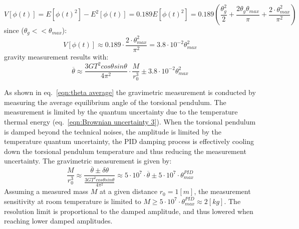\documentclass[\main/master.tex]{subfiles}
\begin{document}
\begin{equation}
V[\phi(t)] = E[\phi(t)^2] - E^2[\phi(t)] =0.189 E [\phi(t)^2] = 0.189 (\frac{\theta_g^2}{2} +\frac{2 \theta_g\theta_{max}}{\pi}+\frac{2\cdot \theta_{max}^2}{\pi^2} )
\end{equation}
 since ($\theta_g<<\theta_{max}$):
\begin{equation}
V[\phi(t)] \approx 0.189\cdot \frac{2\cdot \theta_{max}^2}{\pi^2} =  3.8\cdot 10^{-2} \theta_{max}^2
\end{equation}
gravity measurement results with:
\begin{equation}
\overline{\theta}  \approx \frac{3GT^2cos\theta sin\theta}{4\pi^2 } \cdot \frac{M}{r_0^3} \pm 3.8\cdot 10^{-2} \theta_{max}^2 \label{eqn:theta average}
\end{equation} 
\fi


As shown in eq.~\ref{eqn:theta average} the gravimetric measurement is conducted by measuring the average equilibrium angle of the torsional pendulum. The measurement is limited by the quantum uncertainty due to the temperature thermal energy (eq.~\ref{eqn:Brownian uncertainty 3}). When the torsional pendulum is damped beyond the technical noises, the amplitude is limited by the temperature quantum uncertainty, the PID damping process is effectively cooling down the torsional pendulum temperature and thus reducing the measurement uncertainty. The gravimetric measurement is given by:
\begin{equation}
\frac{M}{r_0^3} \approx \frac{\overline{\theta}\pm \delta\theta}{\frac{3GT^2cos\theta sin\theta}{4\pi^2 }} \approx 5\cdot 10^{7}\cdot \overline{\theta}\pm 5\cdot 10^{7}\cdot \theta_{max}^{PID}
\label{eqn:measurement resolution}
\end{equation}
Assuming a measured mass $M$ at a given distance $r_0 = 1[m]$, the measurement sensitivity at room temperature is limited to $M\geq 5\cdot 10^{7}\cdot \theta_{max}^{PID}\approx 2[kg]$. The resolution limit is proportional to the damped amplitude, and thus lowered when reaching lower damped amplitudes.
\end{document}
